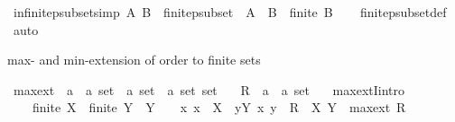 \begin{isabellebody}
\isanewline
%
\endisadelimproof
\isanewline
{}\isamarkupfalse%
\ in{\isacharunderscore}{\kern0pt}finite{\isacharunderscore}{\kern0pt}psubset{\isacharbrackleft}{\kern0pt}simp{\isacharbrackright}{\kern0pt}{\isacharcolon}{\kern0pt}\ {\isachardoublequoteopen}{\isacharparenleft}{\kern0pt}A{\isacharcomma}{\kern0pt}\ B{\isacharparenright}{\kern0pt}\ {\isasymin}\ finite{\isacharunderscore}{\kern0pt}psubset\ {\isasymlongleftrightarrow}\ A\ {\isasymsubset}\ B\ {\isasymand}\ finite\ B{\isachardoublequoteclose}\isanewline
%
\isadelimproof
\ \ %
\endisadelimproof
%
\isatagproof
{}\isamarkupfalse%
\ finite{\isacharunderscore}{\kern0pt}psubset{\isacharunderscore}{\kern0pt}def\ \isamarkupfalse%
\ auto%
\endisatagproof
{\isafoldproof}%
%
\isadelimproof
%
\endisadelimproof
%
\begin{isamarkuptext}%
max- and min-extension of order to finite sets%
\end{isamarkuptext}\isamarkuptrue%
\isamarkupfalse%
\ max{\isacharunderscore}{\kern0pt}ext\ {\isacharcolon}{\kern0pt}{\isacharcolon}{\kern0pt}\ {\isachardoublequoteopen}{\isacharparenleft}{\kern0pt}{\isacharprime}{\kern0pt}a\ {\isasymtimes}\ {\isacharprime}{\kern0pt}a{\isacharparenright}{\kern0pt}\ set\ {\isasymRightarrow}\ {\isacharparenleft}{\kern0pt}{\isacharprime}{\kern0pt}a\ set\ {\isasymtimes}\ {\isacharprime}{\kern0pt}a\ set{\isacharparenright}{\kern0pt}\ set{\isachardoublequoteclose}\isanewline
\ \ \ R\ {\isacharcolon}{\kern0pt}{\isacharcolon}{\kern0pt}\ {\isachardoublequoteopen}{\isacharparenleft}{\kern0pt}{\isacharprime}{\kern0pt}a\ {\isasymtimes}\ {\isacharprime}{\kern0pt}a{\isacharparenright}{\kern0pt}\ set{\isachardoublequoteclose}\isanewline
\ \ \ max{\isacharunderscore}{\kern0pt}extI{\isacharbrackleft}{\kern0pt}intro{\isacharbrackright}{\kern0pt}{\isacharcolon}{\kern0pt}\isanewline
\ \ \ \ {\isachardoublequoteopen}finite\ X\ {\isasymLongrightarrow}\ finite\ Y\ {\isasymLongrightarrow}\ Y\ {\isasymnoteq}\ {\isacharbraceleft}{\kern0pt}{\isacharbraceright}{\kern0pt}\ {\isasymLongrightarrow}\ {\isacharparenleft}{\kern0pt}{\isasymAnd}x{\isachardot}{\kern0pt}\ x\ {\isasymin}\ X\ {\isasymLongrightarrow}\ {\isasymexists}y{\isasymin}Y{\isachardot}{\kern0pt}\ {\isacharparenleft}{\kern0pt}x{\isacharcomma}{\kern0pt}\ y{\isacharparenright}{\kern0pt}\ {\isasymin}\ R{\isacharparenright}{\kern0pt}\ {\isasymLongrightarrow}\ {\isacharparenleft}{\kern0pt}X{\isacharcomma}{\kern0pt}\ Y{\isacharparenright}{\kern0pt}\ {\isasymin}\ max{\isacharunderscore}{\kern0pt}ext\ R{\isachardoublequoteclose}\isanewline

\end{isabellebody}
